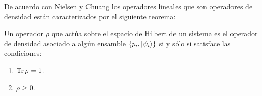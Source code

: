 
De acuerdo con Nielsen y Chuang \cite{nielsen_chuang_2011}
los operadores lineales que son operadores de densidad están 
caracterizados por el siguiente teorema:
\begin{teorema}
Un operador $\rho$  que actúa sobre el espacio de Hilbert de un sistema 
es el operador de densidad asociado a algún ensamble 
$\{p_i, \ket{\psi _i} \}$ si y sólo si satisface las condiciones:
\begin{enumerate}
\item $\Tr \rho = 1$.
\item $\rho \geq 0$.
\end{enumerate}	
\label{teo:density-operator}
\end{teorema}

